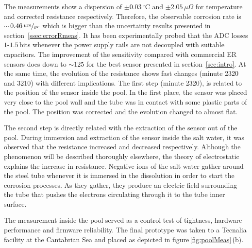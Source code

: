\documentclass[journal,twoside,web]{ieeecolor}
\begin{document}
The measurements show a dispersion of $\pm0.03$\,$^{\circ}$C and $\pm2.05$\,$\mu\Omega$ for temperature and corrected resistance respectively. Therefore, the observable corrosion rate is $\sim$\,$0.46\,\nicefrac{\mu m}{yr}$ which is bigger than the uncertainty results presented in section~\ref{ssec:errorRmeas}. It has been experimentally probed that the ADC losses $1$-$1.5$\,bits whenever the power supply rails are not decoupled with suitable capacitors. The improvement of the sensitivity compared with commercial ER sensors does down to $\sim125$ for the best sensor presented in section~\ref{sec:intro}. At the same time, the evolution of the resistance shows fast changes (minute 2320 and 3210) with different implications. The first step (minute 2320), is related to the position of the sensor inside the pool. In the first place, the sensor was placed very close to the pool wall and the tube was in contact with some plastic parts of the pool. The position was corrected and the evolution changed to almost flat.

The second step is directly related with the extraction of the sensor out of the pool. During immersion and extraction of the sensor inside the salt water, it was observed that the resistance increased and decreased respectively. Although the phenomenon will be described thoroughly elsewhere, the theory of electrostatic explains the increase in resistance. Negative ions of the salt water gather around the steel tube whenever it is immersed in the dissolution in order to start the corrosion processes. As they gather, they produce an electric field surrounding the tube that pushes the electrons circulating through it to the tube inner surface.

The measurement inside the pool served as a control test of tightness, hardware performance and firmware reliability. The final prototype was taken to a Tecnalia facility at the Cantabrian Sea and placed as depicted in figure\,\ref{fig:poolMeas}\,(b).
\vspace{0.5cm}
\end{document}
